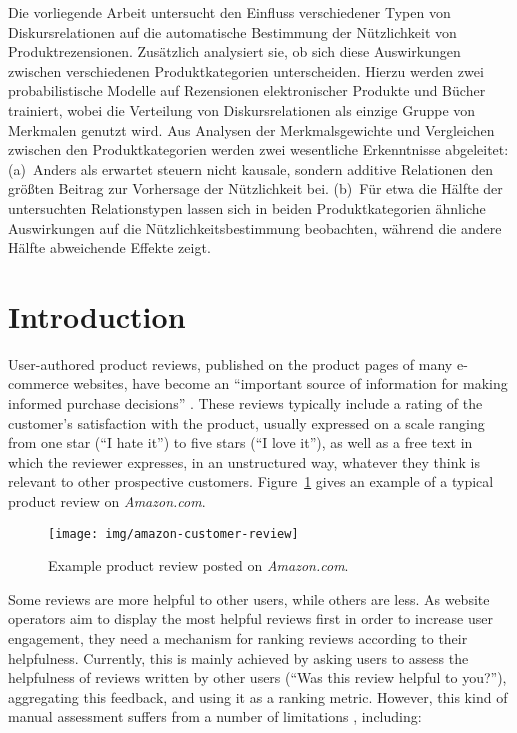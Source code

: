 \documentclass[
    a4paper,%
    12pt,%
    oneside,%
    toc=bibliography,
    final,
]{scrartcl}
\begin{document}
\begin{sloppypar}
Die vorliegende Arbeit untersucht den Einfluss verschiedener Typen von Diskursrelationen auf die automatische Bestimmung der Nützlichkeit von Produktrezensionen. Zusätzlich analysiert sie, ob sich diese Auswirkungen zwischen verschiedenen Produktkategorien unterscheiden. Hierzu werden zwei probabilistische Modelle auf Rezensionen elektronischer Produkte und Bücher trainiert, wobei die Verteilung von Diskursrelationen als einzige Gruppe von Merkmalen genutzt wird. Aus Analysen der Merkmalsgewichte und Vergleichen zwischen den Produktkategorien werden zwei wesentliche Erkenntnisse abgeleitet: (a)~Anders als erwartet steuern nicht kausale, sondern additive Relationen den größten Beitrag zur Vorhersage der Nützlichkeit bei. (b)~Für etwa die Hälfte der untersuchten Relationstypen lassen sich in beiden Produktkategorien ähnliche Auswirkungen auf die Nützlichkeitsbestimmung beobachten, während die andere Hälfte abweichende Effekte zeigt.
\end{sloppypar}

\thispagestyle{empty}
\pagebreak

\section{Introduction}

User-authored product reviews, published on the product pages of many e-commerce websites, have become an “important source of information for making informed purchase decisions” \citep[55]{Almagrabi2015}. These reviews typically include a rating of the customer's satisfaction with the product, usually expressed on a scale ranging from one star (“I hate it”) to five stars (“I love it”), as well as a free text in which the reviewer expresses, in an unstructured way, whatever they think is relevant to other prospective customers. Figure~\ref{fig:amazon-customer-review} gives an example of a typical product review on \textit{Amazon.com}.

\begin{figure}[h!]
\texttt{[image: img/amazon-customer-review]}

\caption{Example product review posted on \textit{Amazon.com}.}
\label{fig:amazon-customer-review}
\end{figure}

Some reviews are more helpful to other users, while others are less. As website operators aim to display the most helpful reviews first in order to increase user engagement, they need a mechanism for ranking reviews according to their helpfulness. Currently, this is mainly achieved by asking users to assess the helpfulness of reviews written by other users (“Was this review helpful to you?”), aggregating this feedback, and using it as a ranking metric. However, this kind of manual assessment suffers from a number of limitations \cite[see][49f.]{Almagrabi2015}, including:
\end{document}
